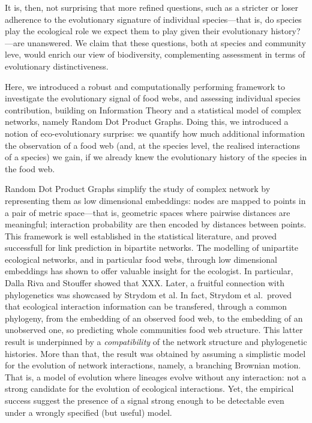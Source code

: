 \documentclass[10pt,oneside]{article}
\begin{document}
It is, then, not surprising that more refined questions, such as a
stricter or loser adherence to the evolutionary signature of individual
species---that is, do species play the ecological role we expect them to
play given their evolutionary history?---are unanswered. We claim that
these questions, both at species and community leve, would enrich our
view of biodiversity, complementing assessment in terms of evolutionary
distinctiveness.

Here, we introduced a robust and computationally performing framework to
investigate the evolutionary signal of food webs, and assessing
individual species contribution, building on Information Theory and a
statistical model of complex networks, namely Random Dot Product Graphs.
Doing this, we introduced a notion of eco-evolutionary surprise: we
quantify how much additional information the observation of a food web
(and, at the species level, the realised interactions of a species) we
gain, if we already knew the evolutionary history of the species in the
food web.

Random Dot Product Graphs simplify the study of complex network by
representing them as low dimensional embeddings: nodes are mapped to
points in a pair of metric space---that is, geometric spaces where
pairwise distances are meaningful; interaction probability are then
encoded by distances between points. This framework is well established
in the statistical literature, and proved successfull for link
prediction in bipartite networks. The modelling of unipartite ecological
networks, and in particular food webs, through low dimensional
embeddings has shown to offer valuable insight for the ecologist. In
particular, Dalla Riva and Stouffer showed that XXX. Later, a fruitful
connection with phylogenetics was showcased by Strydom et al. In fact,
Strydom et al.~proved that ecological interaction information can be
transfered, through a common phylogeny, from the embedding of an
observed food web, to the embedding of an unobserved one, so predicting
whole communities food web structure. This latter result is underpinned
by a \emph{compatibility} of the network structure and phylogenetic
histories. More than that, the result was obtained by assuming a
simplistic model for the evolution of network interactions, namely, a
branching Brownian motion. That is, a model of evolution where lineages
evolve without any interaction: not a strong candidate for the evolution
of ecological interactions. Yet, the empirical success suggest the
presence of a signal strong enough to be detectable even under a wrongly
specified (but useful) model.
\end{document}
